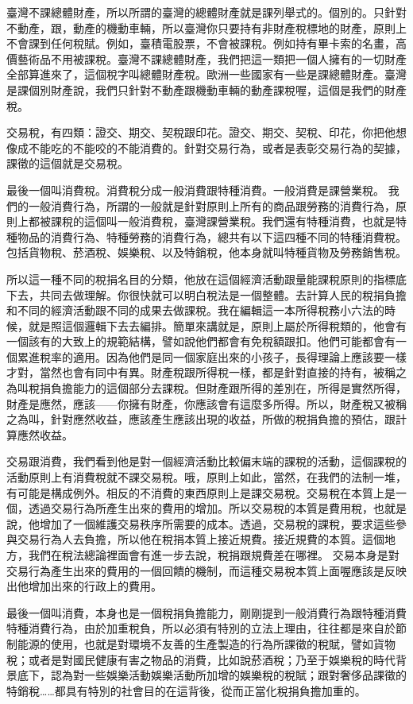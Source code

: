 \documentclass[]{ctexbook}
\begin{document}
臺灣不課總體財產，所以所謂的臺灣的總體財產就是課列舉式的。個別的。只針對不動產，跟，動產的機動車輛，所以臺灣你只要持有非財產稅標地的財產，原則上不會課到任何稅賦。例如，臺積電股票，不會被課稅。例如持有畢卡索的名畫，高價藝術品不用被課稅。臺灣不課總體財產，我們把這一類把一個人擁有的一切財產全部算進來了，這個稅字叫總體財產稅。歐洲一些國家有一些是課總體財產。臺灣是課個別財產說，我們只針對不動產跟機動車輛的動產課稅喔，這個是我們的財產稅。

交易稅，有四類：證交、期交、契稅跟印花。證交、期交、契稅、印花，你把他想像成不能吃的不能咬的不能消費的。針對交易行為，或者是表彰交易行為的契據，課徵的這個就是交易稅。

最後一個叫消費稅。消費稅分成一般消費跟特種消費。一般消費是課營業稅。 我們的一般消費行為，所謂的一般就是針對原則上所有的商品跟勞務的消費行為，原則上都被課稅的這個叫一般消費稅，臺灣課營業稅。我們還有特種消費，也就是特種物品的消費行為、特種勞務的消費行為，總共有以下這四種不同的特種消費稅。包括貨物稅、菸酒稅、娛樂稅、以及特銷稅，他本身就叫特種貨物及勞務銷售稅。

所以這一種不同的稅捐名目的分類，他放在這個經濟活動跟量能課稅原則的指標底下去，共同去做理解。你很快就可以明白稅法是一個整體。去計算人民的稅捐負擔和不同的經濟活動跟不同的成果去做課稅。我在編輯這一本所得稅務小六法的時候，就是照這個邏輯下去去編排。簡單來講就是，原則上屬於所得稅類的，他會有一個該有的大致上的規範結構，譬如說他們都會有免稅額跟扣。他們可能都會有一個累進稅率的適用。因為他們是同一個家庭出來的小孩子，長得理論上應該要一樣才對，當然也會有同中有異。財產稅跟所得稅一樣，都是針對直接的持有，被稱之為叫稅捐負擔能力的這個部分去課稅。但財產跟所得的差別在，所得是實然所得，財產是應然，應該------你擁有財產，你應該會有這麼多所得。所以，財產稅又被稱之為叫，針對應然收益，應該產生應該出現的收益，所做的稅捐負擔的預估，跟計算應然收益。

交易跟消費，我們看到他是對一個經濟活動比較偏末端的課稅的活動，這個課稅的活動原則上有消費稅就不課交易稅。哦，原則上如此，當然，在我們的法制一堆，有可能是構成例外。相反的不消費的東西原則上是課交易稅。交易稅在本質上是一個，透過交易行為所產生出來的費用的增加。所以交易稅的本質是費用稅，也就是說，他增加了一個維護交易秩序所需要的成本。透過，交易稅的課稅，要求這些參與交易行為人去負擔，所以他在稅捐本質上接近規費。接近規費的本質。這個地方，我們在稅法總論裡面會有進一步去說，稅捐跟規費差在哪裡。
交易本身是對交易行為產生出來的費用的一個回饋的機制，而這種交易稅本質上面喔應該是反映出他增加出來的行政上的費用。

最後一個叫消費，本身也是一個稅捐負擔能力，剛剛提到一般消費行為跟特種消費特種消費行為，由於加重稅負，所以必須有特別的立法上理由，往往都是來自於節制能源的使用，也就是對環境不友善的生產製造的行為所課徵的稅賦，譬如貨物稅；或者是對國民健康有害之物品的消費，比如說菸酒稅；乃至于娛樂稅的時代背景底下，認為對一些娛樂活動娛樂活動所加增的娛樂稅的稅賦；跟對奢侈品課徵的特銷稅\ldots\ldots 都具有特別的社會目的在這背後，從而正當化稅捐負擔加重的。
\end{document}
